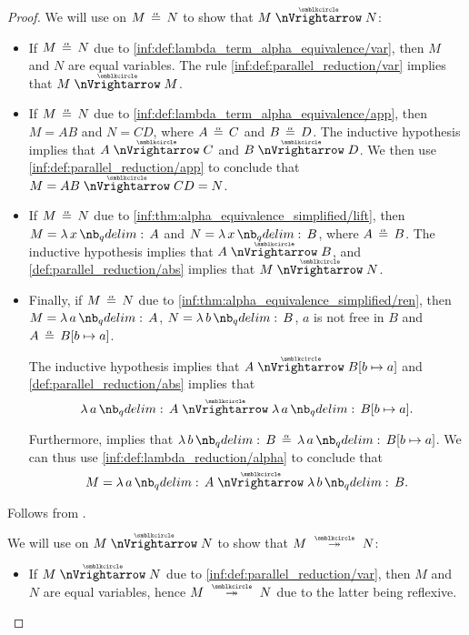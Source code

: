 \begin{proof}
   We will use  on \( M \aequiv N \) to show that \( M \ppred N \):
  \begin{itemize}
    \item If \( M \aequiv N \) due to \ref{inf:def:lambda_term_alpha_equivalence/var}, then \( M \) and \( N \) are equal variables. The rule \ref{inf:def:parallel_reduction/var} implies that \( M \ppred M \).

    \item If \( M \aequiv N \) due to \ref{inf:def:lambda_term_alpha_equivalence/app}, then \( M = AB \) and \( N = CD \), where \( A \aequiv C \) and \( B \aequiv D \). The inductive hypothesis implies that \( A \ppred C \) and \( B \ppred D \). We then use \ref{inf:def:parallel_reduction/app} to conclude that \( M = AB \ppred CD = N \).

    \item If \( M \aequiv N \) due to \ref{inf:thm:alpha_equivalence_simplified/lift}, then \( M = \qabs x A \) and \( N = \qabs x B \), where \( A \aequiv B \). The inductive hypothesis implies that \( A \ppred B \), and \ref{def:parallel_reduction/abs} implies that \( M \ppred N \).

    \item Finally, if \( M \aequiv N \) due to \ref{inf:thm:alpha_equivalence_simplified/ren}, then \( M = \qabs a A \), \( N = \qabs b B \), \( a \) is not free in \( B \) and \( A \aequiv B[b \mapsto a] \).

    The inductive hypothesis implies that \( A \ppred B[b \mapsto a] \) and \ref{def:parallel_reduction/abs} implies that
    \begin{equation*}
      \qabs a A \ppred \qabs a B[b \mapsto a].
    \end{equation*}

    Furthermore,  implies that \( \qabs b B \aequiv \qabs a B[b \mapsto a] \). We can thus use \ref{inf:def:lambda_reduction/alpha} to conclude that
    \begin{equation*}
      M = \qabs a A \ppred \qabs b B.
    \end{equation*}
  \end{itemize}

   Follows from .

   We will use  on \( M \ppred N \) to show that \( M \pred* N \):
  \begin{itemize}
    \item If \( M \ppred N \) due to \ref{inf:def:parallel_reduction/var}, then \( M \) and \( N \) are equal variables, hence \( M \pred* N \) due to the latter being reflexive.


\end{itemize}
\end{proof}
